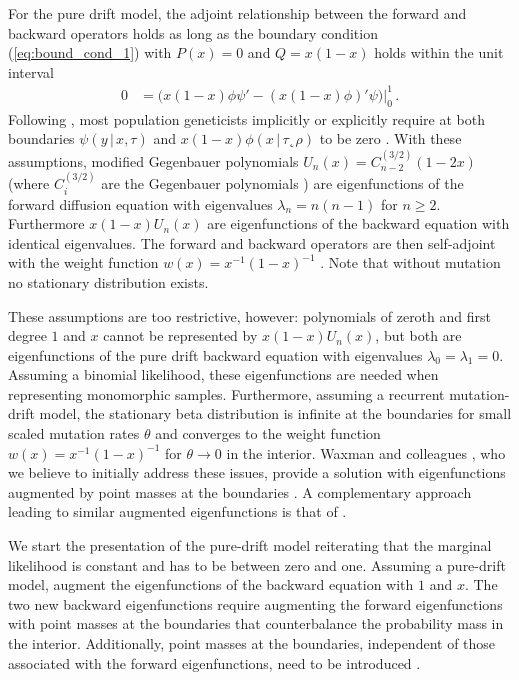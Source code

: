 \documentclass[preprint]{elsarticle}
\newcommand\given{{\,|\,}}
\newcommand\y{\ensuremath{y}}
\begin{document}
For the pure drift model, the adjoint relationship between the forward and backward operators holds as long as the boundary condition (\ref{eq:bound_cond_1}) with $P(x)=0$ and $Q=x(1-x)$ holds within the unit interval 
\begin{equation}\label{eq:bound_pure_drift}
\begin{split}
    0&=\bigg(x(1-x)\phi\psi'-(x(1-x)\phi)'\psi\bigg)\big|_0^1\,.    
\end{split}
\end{equation}
Following \citet{Kimu55}, most population geneticists implicitly or explicitly require at both boundaries $\psi(\y\given x,\tau)$ and $x(1-x)\phi(x\given\tau˛\rho)$ to be zero \citep[see also][]{Ewen04,Song12}. With these assumptions, modified Gegenbauer polynomials $U_n(x)=C_{n-2}^{(3/2)}(1-2x)$ (where $C_{i}^{(3/2)}$ are the Gegenbauer polynomials \citep{Abra70}) are eigenfunctions of the forward diffusion equation with eigenvalues $\lambda_n=n(n-1)$ for $n\geq 2$. Furthermore $x(1-x)U_n(x)$ are eigenfunctions of the backward equation with identical eigenvalues. The forward and backward operators are then self-adjoint with the weight function $w(x)=x^{-1}(1-x)^{-1}$ \citep{Ewen04,Song12}. Note that without mutation no stationary distribution exists.

These assumptions are too restrictive, however: polynomials of zeroth and first degree $1$ and $x$ cannot be represented by $x(1-x)U_n(x)$, but both are eigenfunctions of the pure drift backward equation with eigenvalues $\lambda_0=\lambda_1=0$. Assuming a binomial likelihood, these eigenfunctions are needed when representing monomorphic samples. Furthermore, assuming a recurrent mutation-drift model, the stationary beta distribution is infinite at the boundaries for small scaled mutation rates $\theta$ and converges to the weight function $w(x)=x^{-1}(1-x)^{-1}$ for $\theta\to0$ in the interior. Waxman and colleagues \citep{McKa07,Waxm11}, who we believe to initially  address these issues, provide a solution with eigenfunctions augmented by point masses at the boundaries \citep{McKa07,Waxm11}. A complementary approach leading to similar augmented eigenfunctions is that of \citet{Tran14b}.

We start the presentation of the pure-drift model reiterating that the marginal likelihood is constant and has to be between zero and one. Assuming a pure-drift model, \citet{Tran14b} augment the eigenfunctions of the backward equation with $1$ and $x$. The two new backward eigenfunctions require augmenting the forward eigenfunctions with point masses at the boundaries that counterbalance the probability mass in the interior. Additionally, point masses at the boundaries, independent of those associated with the forward eigenfunctions, need to be introduced \citep{Tran14b}. %
\end{document}
